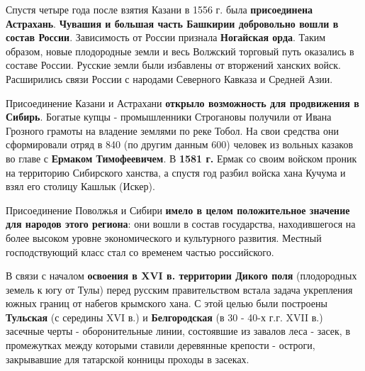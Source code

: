 \documentclass{article}
\begin{document}
\hfill

Спустя четыре года после взятия Казани в 1556 г. была \textbf{присоединена Астрахань}. \textbf{Чувашия и большая часть Башкирии добровольно вошли в состав России}. Зависимость от России признала \textbf{Ногайская орда}. Таким образом, новые плодородные земли и весь Волжский торговый путь оказались в составе России. Русские земли были избавлены от вторжений ханских войск. Расширились связи России с народами Северного Кавказа и Средней Азии.

\hfill

Присоединение Казани и Астрахани \textbf{открыло возможность для продвижения в Сибирь}. Богатые купцы - промышленники Строгановы получили от Ивана Грозного грамоты на владение землями по реке Тобол. На свои средства они сформировали отряд в 840 (по другим данным 600) человек из вольных казаков во главе с \textbf{Ермаком Тимофеевичем}. В \textbf{1581 г.} Ермак со своим войском проник на территорию Сибирского ханства, а спустя год разбил войска хана Кучума и взял его столицу Кашлык (Искер).

\hfill

Присоединение Поволжья и Сибири \textbf{имело в целом положительное значение для народов этого региона}: они вошли в состав государства, находившегося на более высоком уровне экономического и культурного развития. Местный господствующий класс стал со временем частью российского.

\hfill

В связи с началом \textbf{освоения в XVI в. территории Дикого поля} (плодородных земель к югу от Тулы) перед русским правительством встала задача укрепления южных границ от набегов крымского хана. С этой целью были построены \textbf{Тульская} (с середины XVI в.) и \textbf{Белгородская} (в 30 - 40-х г.г. XVII в.) засечные черты - оборонительные линии, состоявшие из завалов леса - засек, в промежутках между которыми ставили деревянные крепости - остроги, закрывавшие для татарской конницы проходы в засеках.
\end{document}
